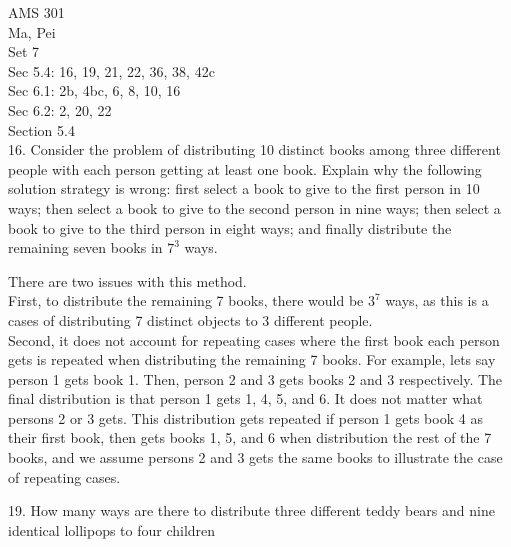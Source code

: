 \documentclass[12pt]{article}
\begin{document}
\noindent
AMS 301\\
Ma, Pei \\
Set 7\\

Sec 5.4: 16, 19, 21, 22, 36, 38, 42c\\
Sec 6.1: 2b, 4bc, 6, 8, 10, 16\\
Sec 6.2: 2, 20, 22\\

Section 5.4\\ 
16. Consider the problem of distributing 10 distinct books among three 
different people with each person getting at least one book. Explain why 
the following solution strategy is wrong: first select a book to give to 
the first person in 10 ways; then select a book to give to the second 
person in nine ways; then select a book to give to the third person in 
eight ways; and finally distribute the remaining seven books in $7^3$ ways.
\begin{solution}
    There are two issues with this method. \\
    First, to distribute the remaining 7 books, there would be $3^7$ ways, 
    as this is a cases of distributing 7 distinct objects to 3 different 
    people. \\
    Second, it does not account 
    for repeating cases where the first book each person gets is repeated 
    when distributing the remaining 7 books. For example, lets say person
    1 gets book 1. Then, person 2 and 3 gets books 2 and 3 respectively. 
    The final distribution is that person 1 gets 1, 4, 5, and 6. It does 
    not matter what persons 2 or 3 gets. This 
    distribution gets repeated if person 1 gets book 4 as their first book, 
    then gets books 1, 5, and 6 when distribution the rest of the 7 books, 
    and we assume persons 2 and 3 gets the same books to illustrate the 
    case of repeating cases. 
\end{solution}
19. How many ways are there to distribute three different teddy bears and 
nine identical lollipops to four children
\end{document}
